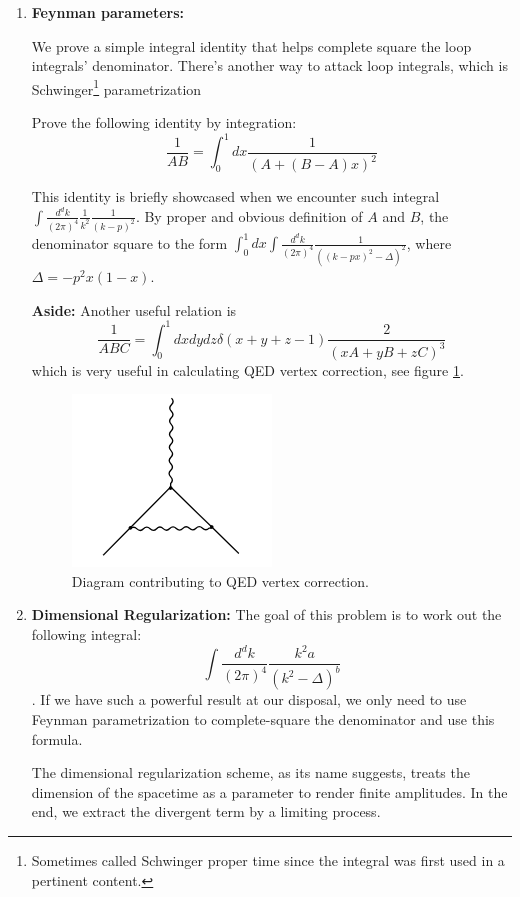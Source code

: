 \documentclass[11pt]{article}
\begin{document}
\begin{enumerate}
\begin{problem}{\points{-}}
		
		
		\end{problem}
	
		\item
		\begin{problem}{\points{-}}
		\textbf{Feynman parameters:}
		
	We prove a simple integral identity that helps complete square the loop integrals' denominator. There's another way to attack loop integrals, which is Schwinger\footnote{Sometimes called Schwinger proper time since the integral was first used in a pertinent content.} parametrization

		 Prove the following identity by integration:
		\[
		\frac{1}{AB} = \int_0^1 dx \frac{1}{(A+(B-A)x)^2}
		\]
		
		This identity is briefly showcased when we encounter such integral $\int \frac{d^dk}{(2\pi)^4} \frac{1}{k^2} \frac{1}{(k-p)^2}$.
		By proper and obvious definition of $A$ and $B$, the denominator square to the form
		$\int_0^1dx\int\frac{d^dk}{(2\pi)^4}\frac{1}{((k-px)^2-\Delta)^2}$, where $\Delta = -p^2x(1-x)$.
		
		\textbf{Aside:} Another useful relation is 
		\[
		\frac{1}{ABC} = \int_0^1 dxdydz \delta(x+y+z-1) \frac{2}{(xA+yB+zC)^3}
		\]
		which is very useful in calculating QED vertex correction, see figure \ref{ammdiag}.
		\begin{figure}[H]
			\centering
			\includegraphics[width=0.2\linewidth]{img/1.png}
			\caption{Diagram contributing to QED vertex correction.}
			\label{ammdiag}
		\end{figure}

	
		\end{problem}
	\item
	\begin{problem}{\points{-}}
		\textbf{Dimensional Regularization:}
		The goal of this problem is to work out the following integral:
		\[
		\int \frac{d^dk}{(2\pi)^4} \frac{k^2a}{(k^2 - \Delta)^b}
		\].
		If we have such a powerful result at our disposal, we only need to use Feynman parametrization to complete-square the denominator and use this formula.
		
		The dimensional regularization scheme, as its name suggests, treats the dimension of the spacetime as a parameter to render finite amplitudes. In the end, we extract the divergent term by a limiting process. 
		

\end{problem}
\end{enumerate}
\end{document}
